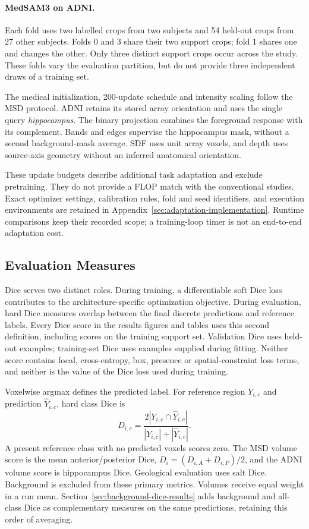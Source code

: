 \paragraph{MedSAM3 on ADNI.}\label{sec:medsam-adni-methods}
Each fold uses two labelled crops from two subjects and 54 held-out
crops from 27 other subjects. Folds 0 and 3 share their two support
crops; fold 1 shares one and changes the other. Only three distinct
support crops occur across the study. These folds vary the evaluation
partition, but do not provide three independent draws of a training set.

The medical initialization, 200-update schedule and intensity scaling
follow the MSD protocol. ADNI retains its stored array orientation and
uses the single query \emph{hippocampus}. The binary projection combines
the foreground response with its complement. Bands and edges supervise
the hippocampus mask, without a second background-mask average.
SDF uses unit array voxels, and depth uses source-axis geometry without
an inferred anatomical orientation.

These update budgets describe additional task adaptation and exclude
pretraining. They do not provide a FLOP match with the conventional
studies. Exact optimizer settings, calibration rules, fold and seed
identifiers, and execution environments are retained in
Appendix~\ref{sec:adaptation-implementation}. Runtime comparisons keep
their recorded scope; a training-loop timer is not an end-to-end
adaptation cost.

\subsection{Evaluation Measures}
\label{sec:evaluation-methods}

Dice serves two distinct roles. During training, a differentiable soft
Dice loss contributes to the architecture-specific optimization
objective. During evaluation, hard Dice measures overlap between the
final discrete predictions and reference labels. Every Dice score in
the results figures and tables uses this second definition, including scores on the
training support set. Validation Dice uses held-out examples;
training-set Dice uses examples supplied during fitting. Neither score
contains focal, cross-entropy, box, presence or spatial-constraint loss
terms, and neither is the value of the Dice loss used during training.

Voxelwise argmax defines the predicted label. For reference region
$Y_{i,c}$ and prediction $\widehat Y_{i,c}$, hard class Dice is
\begin{equation}
 D_{i,c}=\frac{2|Y_{i,c}\cap\widehat Y_{i,c}|}
 {|Y_{i,c}|+|\widehat Y_{i,c}|}.
\label{eq:reported-hard-dice}
\end{equation}
A present reference class with no predicted voxels scores zero.
The MSD volume score is the mean anterior/posterior Dice,
$D_i=(D_{i,A}+D_{i,P})/2$, and the ADNI volume score is hippocampus Dice. Geological evaluation
uses salt Dice.
Background is excluded from these primary metrics. Volumes receive
equal weight in a run mean. Section~\ref{sec:background-dice-results}
adds background and all-class Dice as complementary measures on
the same predictions, retaining this order of averaging.

